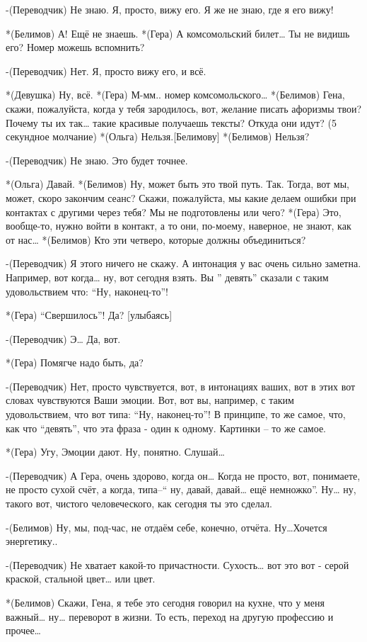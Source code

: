 -(Переводчик) Не знаю. Я, просто, вижу его. Я же не знаю, где я его вижу!

*(Белимов) А! Ещё не знаешь.
*(Гера) А комсомольский билет… Ты не видишь его? Номер можешь вспомнить?

-(Переводчик) Нет. Я, просто вижу его, и всё.

*(Девушка) Ну, всё.
*(Гера) М-мм.. номер комсомольского… 
*(Белимов) Гена, скажи, пожалуйста, когда у тебя зародилось, вот, желание писать афоризмы твои? Почему ты их так… такие красивые получаешь тексты? Откуда они идут?
(5 секундное молчание)
*(Ольга) Нельзя.[Белимову]
*(Белимов) Нельзя?

-(Переводчик) Не знаю. Это будет точнее.

*(Ольга) Давай.
*(Белимов) Ну, может быть это твой путь. Так. Тогда, вот мы, может, скоро закончим сеанс? Скажи, пожалуйста, мы какие делаем ошибки при контактах с другими через тебя? Мы не подготовлены или чего?
*(Гера) Это, вообще-то, нужно войти в контакт, а то они, по-моему, наверное,  не знают, как от нас…
*(Белимов) Кто эти четверо, которые должны объединиться?

-(Переводчик) Я этого ничего не скажу. А интонация у вас очень сильно заметна. Например, вот когда… ну, вот сегодня взять. Вы ” девять”  сказали с таким удовольствием что: “Ну, наконец-то”!

*(Гера) “Свершилось”! Да? [улыбаясь]

-(Переводчик) Э… Да, вот. 

*(Гера) Помягче надо быть, да?

-(Переводчик) Нет, просто чувствуется, вот, в интонациях ваших, вот в этих вот словах чувствуются Ваши эмоции. Вот, вот вы, например, с таким удовольствием, что вот типа: “Ну, наконец-то”! В принципе, то же самое, что, как что “девять”, что эта фраза - один к одному. Картинки – то же самое.

*(Гера) Угу, Эмоции дают. Ну, понятно. Слушай…

-(Переводчик) А Гера, очень здорово, когда он… Когда не просто, вот, понимаете, не просто сухой счёт, а когда, типа–“ ну,  давай, давай… ещё немножко”. Ну… ну, такого вот, чистого человеческого, как сегодня ты это сделал. 

-(Белимов) Ну, мы, под-час, не отдаём себе, конечно, отчёта. Ну…Хочется энергетику.. 

-(Переводчик) Не хватает какой-то причастности. Сухость… вот это вот - серой краской, стальной цвет… или цвет.

*(Белимов) Скажи, Гена, я тебе это сегодня говорил на кухне, что у меня важный… ну… переворот в жизни. То есть, переход на другую профессию и прочее…

